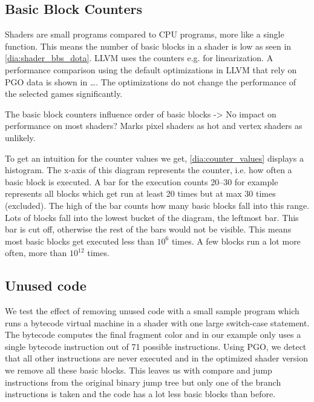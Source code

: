 \clearpage
{}

\subsection{Basic Block Counters}
\label{sub:eval_counters}
Shaders are small programs compared to CPU programs, more like a single function. This means the number of basic blocks in a shader is low as seen in \cref{dia:shader_bbs_dota}.
LLVM uses the counters e.g. for linearization. A performance comparison using the default optimizations in LLVM that rely on PGO data is shown in \dots. The optimizations do not change the performance of the selected games significantly.

The basic block counters influence order of basic blocks -> No impact on performance on most shaders?
Marks pixel shaders as hot and vertex shaders as unlikely.

To get an intuition for the counter values we get, \cref{dia:counter_values} displays a histogram.
The x-axis of this diagram represents the counter, i.e. how often a basic block is executed.
A bar for the execution counts 20--30 for example represents all blocks which get run at least 20 times but at max 30 times (excluded).
The high of the bar counts how many basic blocks fall into this range.
Lots of blocks fall into the lowest bucket of the diagram, the leftmost bar. This bar is cut off, otherwise the rest of the bars would not be visible.
This means most basic blocks get executed less than $10^6$ times. A few blocks run a lot more often, more than $10^12$ times.





\subsection{Unused code}
\label{sub:eval_unused}
We test the effect of removing unused code with a small sample program which runs a bytecode virtual machine in a shader with one large switch-case statement.
The bytecode computes the final fragment color and in our example only uses a single bytecode instruction out of 71 possible instructions.
Using PGO, we detect that all other instructions are never executed and in the optimized shader version we remove all these basic blocks.
This leaves us with compare and jump instructions from the original binary jump tree but only one of the branch instructions is taken and the code has a lot less basic blocks than before.

